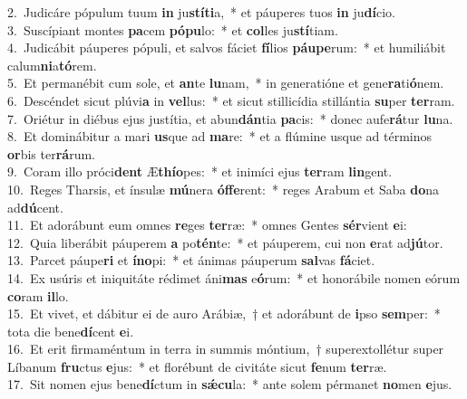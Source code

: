 {2.~}Judicáre pópulum tuum \textbf{in} ju\textbf{stí}\textbf{ti}a,~* et páuperes tuos \textbf{in} ju\textbf{dí}cio.\\
{3.~}Suscípiant montes \textbf{pa}cem \textbf{pó}\textbf{pu}lo:~* et \textbf{col}les ju\textbf{stí}tiam.\\
{4.~}Judicábit páuperes pópuli, et salvos fáciet \textbf{fí}lios \textbf{páu}\textbf{pe}rum:~* et humiliábit calum\textbf{ni}a\textbf{tó}rem.\\
{5.~}Et permanébit cum sole, et \textbf{an}te \textbf{lu}nam,~* in generatióne et gene\textbf{ra}ti\textbf{ó}nem.\\
{6.~}Descéndet sicut plúvi\textbf{a} in \textbf{vel}lus:~* et sicut stillicídia stillántia \textbf{su}per \textbf{ter}ram.\\
{7.~}Oriétur in diébus ejus justítia, et abun\textbf{dán}tia \textbf{pa}cis:~* donec aufe\textbf{rá}tur \textbf{lu}na.\\
{8.~}Et dominábitur a mari \textbf{us}que ad \textbf{ma}re:~* et a flúmine usque ad términos \textbf{or}bis ter\textbf{rá}rum.\\
{9.~}Coram illo próci\textbf{dent} Æ\textbf{thí}\textbf{o}pes:~* et inimíci ejus \textbf{ter}ram \textbf{lin}gent.\\
{10.~}Reges Tharsis, et ínsulæ \textbf{mú}nera \textbf{óf}\textbf{fe}rent:~* reges Arabum et Saba \textbf{do}na ad\textbf{dú}cent.\\
{11.~}Et adorábunt eum omnes \textbf{re}ges \textbf{ter}ræ:~* omnes Gentes \textbf{sér}vient \textbf{e}i:\\
{12.~}Quia liberábit páuperem \textbf{a} po\textbf{tén}te:~* et páuperem, cui non \textbf{e}rat ad\textbf{jú}tor.\\
{13.~}Parcet páupe\textbf{ri} et \textbf{í}\textbf{no}pi:~* et ánimas páuperum \textbf{sal}vas \textbf{fá}ciet.\\
{14.~}Ex usúris et iniquitáte rédimet áni\textbf{mas} e\textbf{ó}rum:~* et honorábile nomen eórum \textbf{co}ram \textbf{il}lo.\\
{15.~}Et vivet, et dábitur ei de auro Arábiæ,~† et adorábunt de \textbf{i}pso \textbf{sem}per:~* tota die bene\textbf{dí}cent \textbf{e}i.\\
{16.~}Et erit firmaméntum in terra in summis móntium,~† superextollétur super Líbanum \textbf{fru}ctus \textbf{e}jus:~* et florébunt de civitáte sicut \textbf{fe}num \textbf{ter}ræ.\\
{17.~}Sit nomen ejus bene\textbf{dí}ctum in \textbf{sǽ}\textbf{cu}la:~* ante solem pérmanet \textbf{no}men \textbf{e}jus.\\
